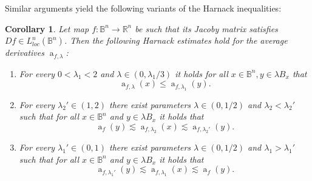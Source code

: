 \documentclass[11pt,a4paper,reqno]{amsart}
\newtheorem{cor}[theorem]{Corollary}
\theoremstyle{definition}
\newtheorem{remark}[theorem]{Remark}
\renewcommand{\a}{\operatorname{a}}
\newcommand{\B}{\mathbb{B}^n}
\newcommand{\R}{\mathbb{R}}
\newcommand{\blue}{\color{blau}}
\newcounter{komcounter}
\numberwithin{komcounter}{section}
\newcommand{\komT}[1]{{\bf \blue [\refstepcounter{komcounter}\thekomcounter (by T): #1]}}
\begin{document}

Similar arguments yield the following variants of the Harnack inequalities:
\begin{cor}\label{cor:harnack-est}
Let map $f:\B\rightarrow \R^n$ be such that its Jacoby matrix satisfies ${D\!f \in L^n_{loc}(\B)}$.
Then the following Harnack estimates hold for the average derivatives $\a_{f,\lambda}$:
\begin{enumerate}
\item[(a)] For every $0<\lambda_1<2$ and $\lambda \in (0,  \lambda_1/3 )$ it holds for all $x\in \B , y\in\lambda B_x$  that
\begin{equation}
\a_{f,\lambda}(x)\leq \a_{f,\lambda_1}(y). 
\label{eq:Harnacklambda1prime}
\end{equation}
\item[(b)] For every $\lambda_2' \in (1,2)$ there exist parameters $\lambda\in (0,1/2)$ and $\lambda_2 <\lambda_2'$ such that for all $x\in \B$ and $y\in \lambda B_x$ it holds that
\begin{equation}
\a_f(y)\lesssim \a_{f,\lambda_2}(x) \lesssim \a_{f,\lambda_2'}(y). \label{cor12:est2}
\end{equation}
\item[(c)] For every $\lambda_1'\in (0,1)$ there exist parameters $\lambda\in (0,1/2)$ and $\lambda_1>\lambda_1'$ such that for all $x\in \B$ and $y\in \lambda B_x$ it holds that
\begin{equation}
 \a_{f,\lambda_1'}(y)\lesssim \a_{f,\lambda_1}(x) \lesssim \a_{f}(y). \label{cor12:est3}
\end{equation}
\end{enumerate}
\end{cor}
\end{document}
